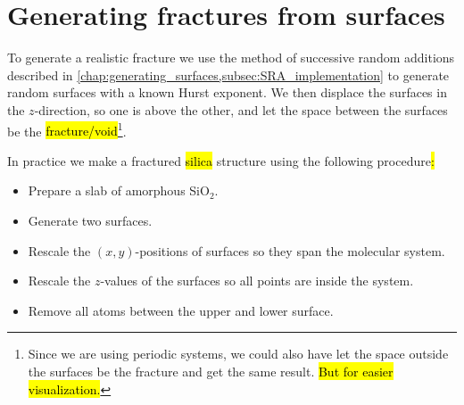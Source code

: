 
\section{Generating fractures from surfaces\label{sec:generating_fractures}}
To generate a realistic fracture we use the method of successive random additions described in \cref{chap:generating_surfaces,subsec:SRA_implementation} to generate random surfaces with a known Hurst exponent. We then displace the surfaces in the $z$-direction, so one is above the other, and let the space between the surfaces be the \hl{fracture/void}\footnote{Since we are using periodic systems, we could also have let the space outside the surfaces be the fracture and get the same result. \hl{But for easier visualization.}}.

In practice we make a fractured \hl{silica} structure using the following procedure\hl{:}
\begin{itemize}
    \item Prepare a slab of amorphous SiO$_2$.
    \item Generate two surfaces.
    \item Rescale the $(x,y)$-positions of surfaces so they span the molecular system.
    \item Rescale the $z$-values of the surfaces so all points are inside the system.
    \item Remove all atoms between the upper and lower surface.
\end{itemize}

